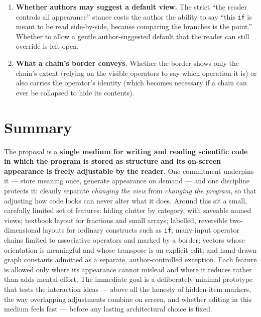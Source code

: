 \documentclass[11pt]{article}
\newcommand{\req}[1]{\textbf{\color{accent}#1}}
\begin{document}
\begin{enumerate}[leftmargin=1.6em,itemsep=5pt]
  \item \req{Whether authors may suggest a default view.} The strict ``the reader controls all appearance'' stance costs the author the ability to say ``this \texttt{if} is meant to be read side-by-side, because comparing the branches is the point.'' Whether to allow a gentle author-suggested default that the reader can still override is left open.
  \item \req{What a chain's border conveys.} Whether the border shows only the chain's extent (relying on the visible operators to say which operation it is) or also carries the operator's identity (which becomes necessary if a chain can ever be collapsed to hide its contents).
\end{enumerate}

\section{Summary}
The proposal is a \req{single medium for writing and reading scientific code in which the program is stored as structure and its on-screen appearance is freely adjustable by the reader}. One commitment underpins it --- store meaning once, generate appearance on demand --- and one discipline protects it: cleanly separate \emph{changing the view} from \emph{changing the program}, so that adjusting how code looks can never alter what it does. Around this sit a small, carefully limited set of features: hiding clutter by category, with saveable named views; textbook layout for fractions and small arrays; labelled, reversible two-dimensional layouts for ordinary constructs such as \texttt{if}; many-input operator chains limited to associative operators and marked by a border; vectors whose orientation is meaningful and whose transpose is an explicit edit; and hand-drawn graph constants admitted as a separate, author-controlled exception. Each feature is allowed only where its appearance cannot mislead and where it reduces rather than adds mental effort. The immediate goal is a deliberately minimal prototype that tests the interaction ideas --- above all the honesty of hidden-item markers, the way overlapping adjustments combine on screen, and whether editing in this medium feels fast --- before any lasting architectural choice is fixed.
\end{document}
